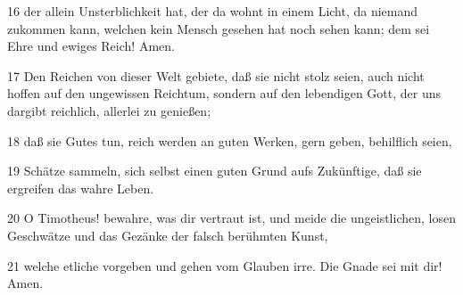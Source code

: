 \par 16 der allein Unsterblichkeit hat, der da wohnt in einem Licht, da niemand zukommen kann, welchen kein Mensch gesehen hat noch sehen kann; dem sei Ehre und ewiges Reich! Amen.
\par 17 Den Reichen von dieser Welt gebiete, daß sie nicht stolz seien, auch nicht hoffen auf den ungewissen Reichtum, sondern auf den lebendigen Gott, der uns dargibt reichlich, allerlei zu genießen;
\par 18 daß sie Gutes tun, reich werden an guten Werken, gern geben, behilflich seien,
\par 19 Schätze sammeln, sich selbst einen guten Grund aufs Zukünftige, daß sie ergreifen das wahre Leben.
\par 20 O Timotheus! bewahre, was dir vertraut ist, und meide die ungeistlichen, losen Geschwätze und das Gezänke der falsch berühmten Kunst,
\par 21 welche etliche vorgeben und gehen vom Glauben irre. Die Gnade sei mit dir! Amen.

